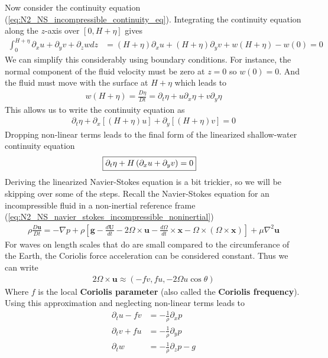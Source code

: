 \documentclass[a4paper, 12pt]{article}
\numberwithin{equation}{subsubsection}
\begin{document}
Now consider the continuity equation (\ref{eq:N2_NS_incompressible_continuity_eq}). Integrating the continuity equation along the $z$-axis over $[0, H + \eta]$ gives
\begin{align}
	\int_0^{H + \eta} \partial_x u + \partial_y v + \partial_z w dz &= (H + \eta) \partial_x u + (H + \eta) \partial_y v + w(H + \eta) - w(0) = 0
\end{align}
We can simplify this considerably using boundary conditions. For instance, the normal component of the fluid velocity must be zero at $z=0$ so $w(0) = 0$. And the fluid must move with the surface at $H + \eta$ which leads to
\begin{align}
	w(H + \eta) = \frac{D \eta}{D t} = \partial_t \eta + u \partial_x \eta + v \partial_y \eta
\end{align}
This allows us to write the continuity equation as
\begin{align}
	\partial_t \eta + \partial_x \left[(H + \eta) u  \right] + \partial_y \left[(H + \eta) v \right] = 0
\end{align}
Dropping non-linear terms leads to the final form of the linearized shallow-water continuity equation
\begin{align}
	\Aboxed{\partial_t \eta + H \left(\partial_x u + \partial_y v \right) = 0}
\end{align}
Deriving the linearized Navier-Stokes equation is a bit trickier, so we will be skipping over some of the steps. Recall the Navier-Stokes equation for an incompressible fluid in a non-inertial reference frame (\ref{eq:N2_NS_navier_stokes_incompressible_noninertial})
\begin{align*}
	\rho \frac{D \mathbf{u}}{D t} = - \nabla p + \rho \left[ \mathbf{g} - \frac{d \mathbf{U}}{dt} - 2 \Omega \times \mathbf{u} - \frac{d\Omega}{d t} \times \mathbf{x} - \Omega \times (\Omega \times \mathbf{x})\right] + \mu {\nabla^2}  \mathbf{u}
\end{align*}
For waves on length scales that do are small compared to the circumferance of the Earth, the Coriolis force acceleration can be considered constant. Thus we can write
\begin{align*}
	2 \Omega \times \mathbf{u} \approx (-f v, f u, - 2\Omega u \cos \theta)
\end{align*}
Where $f$ is the local \textbf{Coriolis parameter} (also called the \textbf{Coriolis frequency}). Using this approximation and neglecting non-linear terms leads to
\begin{align}
	\partial_t u - fv &= - \frac{1}{\rho} \partial_x p \\
	\partial_t v + fu &= - \frac{1}{\rho} \partial_y p \\
	\partial_t w &= - \frac{1}{\rho} \partial_z p - g
\end{align}
\end{document}
